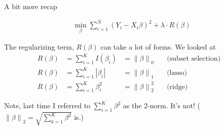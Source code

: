 \documentclass[mathserif, aspectratio=169]{beamer}
\newcommand{\norm}[1]{\left\lVert #1 \right\rVert}
\begin{document}
\begin{frame}{A bit more recap}

\begin{align*}
\min_\beta \sum_{i=1}^N \left(Y_i - X_i \beta \right)^2+\lambda \cdot R(\beta)\end{align*}

The regularizing term, $R(\beta)$ can take a lot of forms.  We looked at
\begin{align*}
R(\beta) & =\sum_{i=1}^K I(\beta_i) &= \norm{\beta}_0 & \quad \text{(subset selection)} &\\
R(\beta) & =\sum_{i=1}^K |\beta_i| & = \norm{\beta}_1 & \quad \text{(lasso)} &\\
R(\beta) & =\sum_{i=1}^K \beta_i^2 & = \norm{\beta}_2^2 & \quad \text{(ridge)} &
\end{align*}

Note, last time I referred to $\sum_{i=1}^K \beta^2$ as the 2-norm.  It's not!  ($\norm{\beta}_2 = \sqrt{\sum_{k=1}^K \beta^2}$ is.)

\end{frame}
\end{document}
